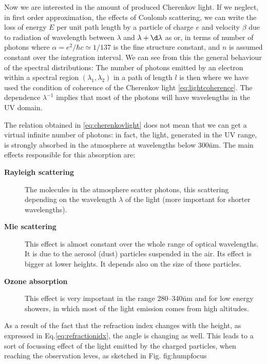 Now we are interested in the amount of produced Cherenkov light. If we
neglect, in first order approximation, the effects of Coulomb
scattering, we can write the loss of energy $E$ per unit path length
by a particle of charge $e$ and velocity $\beta$ due to \Cherenkov
radiation of wavelength between $\lambda$ and $\lambda+\d \lambda$ as
%
\dEdheq
%
or, in terms of number of photons
%
\dNdheq
%
where $\alpha = e^2/\hbar c \simeq 1/137$ is the fine structure
constant, and $n$ is assumed constant over the integration interval.
We can see from this the general behaviour of the spectral
distributions:
%
\specdistreq
%
The number of photons emitted by an electron within a spectral region
$(\lambda_1,\lambda_2)$ in a path of length $l$ is then
%
\phemiteq
%
where we have used the condition of coherence of the Cherenkov light
\eqref{eq:lightcoherence}. The dependence $\lambda^{-1}$ implies that
most of the photons will have wavelengths in the UV domain.

The relation obtained in \eqref{eq:cherenkovlight} does not mean that
we can get a virtual infinite number of \Cherenkov photons: in fact,
the \Cherenkov light, generated in the UV range, is strongly absorbed
in the atmosphere at wavelengths below 300\u{nm}. The main effects
responsible for this absorption are:

\begin{description}
  
\item[\textbf{Rayleigh scattering}] The molecules in the atmosphere
  scatter photons, this scattering depending on the wavelength
  $\lambda$ of the light (more important for shorter wavelengths).
  
\item[\textbf{Mie scattering}] This effect is almost constant over the
  whole range of optical wavelengths. It is due to the aerosol (dust)
  particles suspended in the air. Its effect is bigger at lower
  heights. It depends also on the size of these particles.
  
\item[\textbf{Ozone absorption}] This effect is very important in the
  range 280--340\u{nm} and for low energy showers, in which most of
  the \Cherenkov light emission comes from high altitudes.

\end{description}

As a result of the fact that the refraction index changes with the
height, as expressed in Eq.\eqref{eq:refractionidx}, the \Cherenkov
angle is changing as well. This leads to a sort of focussing effect of
the \Cherenkov light emitted by the charged particles, when reaching
the observation leves, as sketched in Fig. {fig:humpfocus}


